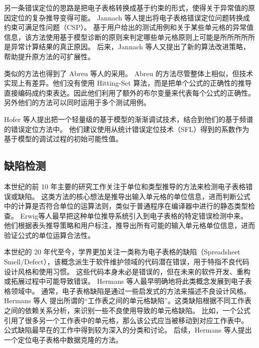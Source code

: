 另一条错误定位的思路是把电子表格转换成基于约束的形式，使得关于异常值的原因定位的复杂推导变得可能。
Jannach 等人\cite{jannach2010toward}提出将电子表格错误定位问题转换成约束可满足性问题（CSP）\cite{tsang2014foundations}。
基于用户给出的测试用例和关于某些单元格的异常值信息，该方法使用基于模型诊断的原则来判定哪些单元格原则上可能是所所所所所是异常计算结果的真正原因。
后来，Jannach 等人\cite{jannach2016model}又提出了新的算法改进策略，帮助提升原方法的可扩展性。

类似的方法也得到了 Abreu 等人\cite{abreu2012constraint,abreu2012debugging}的采用。
Abreu 的方法尽管整体上相似，但技术实现上有差异。他们没有使用 Hitting-Set 算法\cite{reiter1987theory}，而是把单个公式的正确性的推导直接编码成约束表达。因此他们利用了额外的布尔变量来代表每个公式的正确性。另外他们的方法可以同时运用于多个测试用例。

Hofer 等人\cite{hofer2013empirical}提出把一个轻量级的基于模型的渐渐调试技术，结合到他们的基于频谱的错误定位方法中。
他们建议使用从统计错误定位技术（SFL）得到的系数作为基于模型的调试过程的初始可能性值。

\subsection{缺陷检测}%
本世纪的前 10 年主要的研究工作关注于单位和类型推导的方法\cite{erwig2002adding,burnett2002testing,ahmad2003type,abraham2004header,abraham2006type,abraham2007ucheck,antoniu2004validating,chambers2009automatic,chambers2010reasoning}来检测电子表格错误或缺陷。
这类方法的核心想法是推导出输入单元格的单位信息，进而判断公式中的计算是否符合单位的运算法则，类似于普通程序在编译器中进行的静态类型检查。
Erwig等人\cite{erwig2002adding,abraham2004header}最早把这种单位推导系统引入到电子表格的特定错误检测中来。
他们根据表头推导策略和用户标注，推导出所有可能的输入单元格单位信息，进而验证公式的单位运算合法性。

本世纪的 20 年代至今，学界更加关注一类称为电子表格的缺陷（Spreadsheet Smell/Defect），该概念派生于软件维护领域的代码潜在错误\cite{fowler1997refactoring}，用于特指不良代码设计风格和使用习惯。
这些代码本身未必是错误的，但在未来的软件开发、重构或拓展过程中可能导致错误。
Hermans 等人\cite{hermans2012detecting,hermans2012detecting2,hermans2013data}最早明确地将此类概念发展到电子表格领域中。
通常，电子表格缺陷是通过一些启发式的方法来描述不良设计风格。
Hermans 等人\cite{hermans2012detecting} 提出所谓的“工作表之间的单元格缺陷”。这类缺陷根据不同工作表之间的依赖关系分析，来识别一些不良使用导致的单元格缺陷。
比如，一个公式引用了很多另一个工作表中的单元格，那么该公式应当被移动到对应工作表中。
公式缺陷最早在\cite{hermans2012detecting2}的工作中得到较为深入的分类和讨论。
后续，Hermans 等人\cite{hermans2013data}提出一个定位电子表格中数据克隆的方法。

